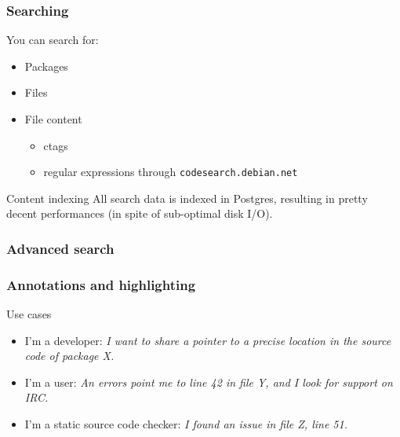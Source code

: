 \documentclass{beamer}
\begin{document}
\begin{frame}
  \frametitle{Searching}
  You can search for:
  \begin{itemize}
  \item Packages
  \item Files
  \item File content
    \begin{itemize}
    \item ctags
    \item regular expressions through \texttt{codesearch.debian.net}
    \end{itemize}
  \end{itemize}
  \vfill
  \begin{block}{Content indexing}
    All search data is indexed in Postgres, resulting in pretty decent
    performances (in spite of sub-optimal disk I/O).
  \end{block}
\end{frame}

\begin{frame}
  \frametitle{Advanced search}
\end{frame}

\begin{frame}
  \frametitle{Annotations and highlighting}
  \begin{block}{Use cases}
    \begin{itemize}
    \item I'm a \alert{developer}: \textit{I want to share a pointer to a
        precise location in the source code of package X.}
    \item I'm a \alert{user}: \textit{An errors point me to line 42 in file Y,
        and I look for support on IRC.}
    \item I'm a \alert{static source code checker}: \textit{I found an issue in
        file Z, line 51.}
    \end{itemize}
  \end{block}
\end{frame}
\end{document}
